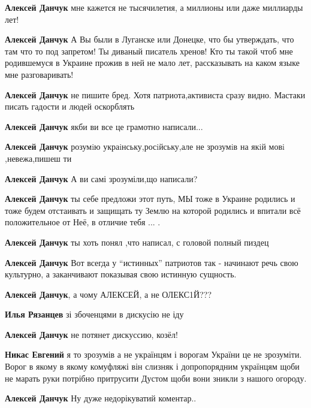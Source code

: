 \begin{itemize}

\textbf{Алексей Данчук} мне кажется не тысячилетия, а миллионы или даже миллиарды лет!

\textbf{Алексей Данчук} А Вы были в Луганске или Донецке, что бы утверждать,
что там что то под запретом! Ты диваный писатель хренов! Кто ты такой чтоб мне
родившемуся в Украине прожив в ней не мало лет, рассказывать на каком языке мне
разговаривать!

\textbf{Алексей Данчук} не пишите бред. Хотя патриота,активиста сразу видно.
Мастаки писать гадости и людей оскорблять

\textbf{Алексей Данчук} якби ви все це грамотно написали...

\textbf{Алексей Данчук} розумiю украiнську,росiйську,але не зрозумiв на якiй мовi ,невежа,пишеш ти

\textbf{Алексей Данчук} А ви самі зрозуміли,що написали?

\textbf{Алексей Данчук} ты себе предложи этот путь, МЫ тоже в Украине родились и тоже будем отстаивать и защищать ту Землю на которой родились и впитали всё положительное от Неё, в отличие тебя ... .

\textbf{Алексей Данчук} ты хоть понял ,что написал, с головой полный пиздец


\textbf{Алексей Данчук} Вот всегда у \enquote{истинных} патриотов так - начинают речь
свою культурно, а заканчивают показывая свою истинную сущность.

\textbf{Алексей Данчук}, а чому АЛЕКСЕЙ, а не ОЛЕКС1Й???

\textbf{Илья Рязанцев} зі збоченцями в дискусію не іду

\textbf{Алексей Данчук} не потянет дискуссию, козёл!


\textbf{Никас Евгений} я то зрозумів а не українцям і ворогам України це не зрозуміти.
Ворог в якому в якому комуфляжі він слизняк і допропорядним українцям щоби не
марать руки потрібно притрусити Дустом щоби вони зникли з нашого огороду.

\textbf{Алексей Данчук} Ну дуже недорікуватий коментар..


\end{itemize}
